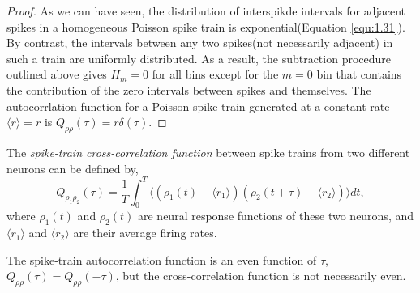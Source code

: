 \begin{thm}
\begin{proof}
    As we can have seen, the distribution of interspikde intervals for adjacent spikes in a homogeneous Poisson spike train is exponential(Equation \ref{equ:1.31}). By contrast, the intervals between any two spikes(not necessarily adjacent) in such a train are uniformly distributed. As a result,  the subtraction procedure outlined above gives $H_m=0$ for all bins except for the $m=0$ bin that contains the contribution of the zero intervals between spikes and themselves. The autocorrlation function for a Poisson spike train generated at a constant rate $\langle r\rangle = r$ is $Q_{\rho\rho}(\tau)=r\delta(\tau)$.
  \end{proof}\qedhere
\end{thm}

\begin{defn}
  The \emph{spike-train cross-correlation function} between spike trains from two different neurons can be defined by,  
  \begin{equation}
    Q_{\rho_1 \rho_2}(\tau)=\frac{1}{T}\int^T_0 \langle (\rho_1(t)-\langle r_1 \rangle)(\rho_2(t+\tau)-\langle r_2\rangle)\rangle dt, 
  \end{equation}
  where $\rho_1(t)$ and $\rho_2(t)$ are neural response functions of these two neurons, and $\langle r_1 \rangle$ and $\langle r_2\rangle$ are their average firing rates.
\end{defn}

\begin{rem}
  The spike-train autocorrelation function is an even function of $\tau$, $ Q_{\rho\rho}(\tau)=Q_{\rho\rho}(-\tau)$, but the cross-correlation function is not necessarily even.
\end{rem}

